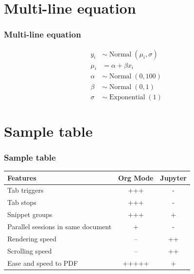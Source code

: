 \documentclass[aspectratio=169]{beamer}
\begin{document}
\section{Multi-line equation}
\begin{frame}
\frametitle{Multi-line equation}
\Large{
\begin{center}
\begin{equation}
\begin{aligned}
y_{i} & \sim \operatorname{Normal}\left(\mu_{i}, \sigma\right) \\
\mu_{i} &=\alpha+\beta x_{i} \\
\alpha & \sim \operatorname{Normal}(0,100) \\
\beta & \sim \operatorname{Normal}(0,1) \\
\sigma & \sim \operatorname{Exponential}(1)
\end{aligned}
\end{equation}
\end{center}
}
\end{frame}
\note{}





\section{Sample table}
\begin{frame}
\frametitle{Sample table}

\begin{center}
\begin{center}
\begin{large}
\begin{tabular}{lcc}
\toprule
\textbf{Features} & \textbf{Org Mode} & \textbf{Jupyter}\\
\midrule
Tab triggers & +++ & - \\
Tab stops & +++ & -\\
Snippet groups & +++ & +\\
Parallel sessions in same document & + & -\\
Rendering speed & -- & ++ \\
Scrolling speed & -- & ++\\
Ease and speed to PDF & +++++ & + \\
\bottomrule
\end{tabular}
\end{large}
\end{center}    
    
    
\end{center}

\end{frame}
\end{document}
